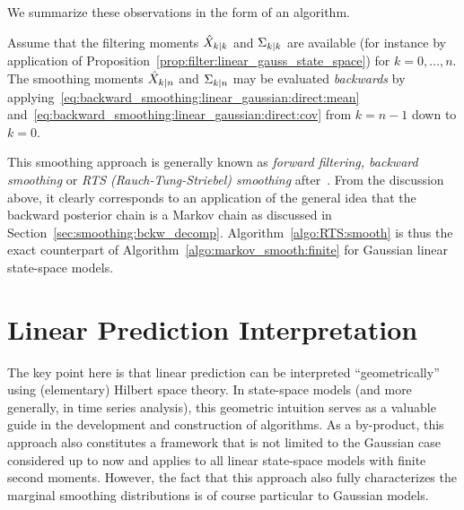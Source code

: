 We summarize these observations in the form of an algorithm.

\begin{algo}
  \label{algo:RTS:smooth}
  Assume that the filtering moments $\hat{X}_{k|k}$ and $\Sigma_{k|k}$ are available
  (for instance by application of
  Proposition~\ref{prop:filter:linear_gauss_state_space}) for $k=0,\dots,n$.
  The smoothing moments $\hat{X}_{k|n}$ and $\Sigma_{k|n}$ may be evaluated
  {\em backwards} by
  applying~\eqref{eq:backward_smoothing:linear_gaussian:direct:mean}
  and~\eqref{eq:backward_smoothing:linear_gaussian:direct:cov} from $k=n-1$
  down to $k=0$.
\end{algo}

This smoothing approach is generally known as {\em forward filtering, backward
  smoothing} or {\em RTS (Rauch-Tung-Striebel) smoothing}
after~\cite{rauch:tung:striebel:1965}. From the discussion above, it clearly
corresponds to an application of the general idea that the backward posterior
chain is a Markov chain as discussed in
Section~\ref{sec:smoothing:bckw_decomp}.  Algorithm~\ref{algo:RTS:smooth} is
thus the exact counterpart of Algorithm~\ref{algo:markov_smooth:finite} for
Gaussian linear state-space models.


\section{Linear Prediction Interpretation}
\label{sec:LSSM:L2_interp}
The key point here is that linear prediction can be interpreted ``geometrically'' using
(elementary) Hilbert space theory. In state-space models (and more generally,
in time series analysis), this geometric intuition serves as a valuable guide
in the development and construction of algorithms. As a by-product, this
approach also constitutes a framework that is not limited to the Gaussian case
considered up to now and applies to all linear state-space models with finite
second moments. However, the fact that this approach also fully
characterizes the marginal smoothing distributions is of course particular to
Gaussian models.

